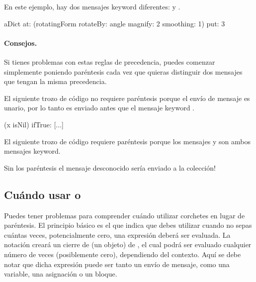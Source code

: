 \documentclass[a4paper,10pt,twoside]{book}
\begin{document}
En este ejemplo, hay dos mensajes keyword diferentes:  y .

\begin{code}{}
aDict
   at: (rotatingForm
          rotateBy: angle	
          magnify: 2
          smoothing: 1)
   put: 3
\end{code}



\paragraph{Consejos.} Si tienes problemas con estas reglas de precedencia, puedes comenzar simplemente poniendo paréntesis cada vez que quieras distinguir dos mensajes que tengan la misma precedencia.

El siguiente trozo de código no requiere paréntesis porque el envío de mensaje  es unario, por lo tanto es enviado antes que el mensaje keyword .
\begin{code}{}
(x isNil)
   ifTrue: [...]
\end{code}

El siguiente trozo de código requiere paréntesis porque los mensajes  y  son ambos mensajes keyword.
\noindent
Sin los paréntesis el mensaje desconocido  sería enviado a la colección!

\subsection{Cuándo usar \lct{[ ]} o \lct{( )}}
Puedes tener problemas para comprender cuándo utilizar corchetes en lugar de paréntesis.
El principio básico es el que indica que debes utilizar \ct{[ ]} cuando no sepas cuántas veces, potencialmente cero, una expresión deberá ser evaluada.
La notación  creará un cierre de  (\ie un objeto) de , el cual podrá ser evaluado cualquier número de veces (posiblemente cero), dependiendo del contexto. Aquí se debe notar que dicha expresión puede ser tanto un envío de mensaje, como una variable, una asignación o un bloque.
\end{document}
